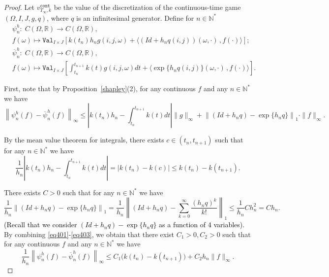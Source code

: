 \documentclass[english,openary,12pt]{article}
\newcommand{\red}[1]{\textcolor{black}{#1}}
\theoremstyle{definition}
\newcommand{\R}{\mathbb{R}}
\newcommand{\N}{\mathbb{N}}
\begin{document}
\begin{proof}
Let $v^{\texttt{cont}}_{T_\infty,k}$ be the value of the discretization of
the continuous-time game
$(\Omega, I, J, g, q)$, where $q$ is an infinitesimal generator. 
Define for $n \in \N^*$
\begin{align*}
  &\psi_n^h : \; C(\Omega, \R) \to C(\Omega, \R),\\
  &f(\omega) \mapsto
  \texttt{Val}_{I \times J} 
  [k(t_n) h_n g(i,j,\omega) + 
  \langle(Id + h_n q(i,j))(\omega,\cdot)\,, f(\cdot)\rangle];\\
  &\overline \psi_n^h : \; C(\Omega, \R) \to C(\Omega, \R),\\
  &f(\omega) \mapsto
  \texttt{Val}_{I \times J} 
  \left[\int_{t_n}^{t_{n+1}} k(t) g(i, j, \omega) dt 
  + \langle \exp\{h_n q(i,j)\}(\omega,\cdot)\,, f(\cdot)\rangle\right].
\end{align*}

First, note that by Proposition~\ref{shapley}(2), for any continuous $f$ and any $n \in \N^*$ we have
\begin{equation}
  \label{eq401}
  \left\|\psi_n^h (f) - \overline \psi_n^h (f)\right\|_\infty \le 
  \left| k(t_n) h_n - \int_{t_n}^{t_{n+1}} k(t) dt\right| 
  \|g\|_\infty + 
  \left\|\left( Id + h_n q \right) - \exp\{h_n q\}\right\|_1 \cdot 
  \|f\|_\infty.
\end{equation}

By the mean value theorem for integrals, there exists $c\in (t_n, t_{n+1})$
such that for any $n \in \N^*$ we have
\begin{equation}
  \label{eq402}
  \frac{1}{h_n} \left| k(t_n) h_n - \int_{t_n}^{t_{n+1}} k(t) dt \right|
  = \left| k(t_n) - k(c) \right| \le
  k(t_n) - k(t_{n+1}).
\end{equation}

There exists $C>0$ such that for any $n \in \N^*$ we have
\begin{equation}
  \label{eq403}
  \frac{1}{h_n} \left\|\left(Id + h_n q\right) - \exp\{h_n q\}\right\|_1
  = \frac{1}{h_n} \left\|\left(Id + h_n q\right) - 
  \sum_{k=0}^\infty \frac{(h_n q)^k}{k !} \right\|_1 \le
  \frac{1}{h_n} C h_n^2 = C h_n.
\end{equation}
\red{(Recall that we consider $\left(Id + h_n q\right) - \exp\{h_n q\}$ as a function of 4 variables).} By combining \eqref{eq401}-\eqref{eq403}, we obtain that there exist 
$C_1 > 0, C_2 > 0$ such that for any continuous $f$ and
any $n \in \N^*$ we have
\begin{equation}
  \label{eq404}
  \frac{1}{h_n} \left\|\psi_n^h (f) - \overline \psi_n^h (f)\right\|_\infty
  \le C_1 \big(k(t_n) - k(t_{n+1})\big) + C_2 h_n \|f\|_\infty.
\end{equation}


\end{proof}
\end{document}
